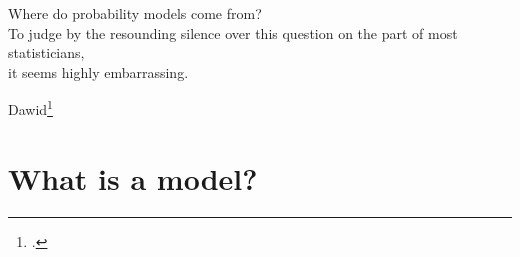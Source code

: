 \documentclass[\ifafour a4paper,12pt,\else a5paper,10pt,\fi%
onecolumn,oneside,article,%
british%
]{memoir}
\title{\propertitle}
\author{%
\hspace*{\stretch{1}}%
\parbox{0.5\linewidth}%
{\protect\centering P.G.L.  Porta Mana\\%
\footnotesize\epost{\email{piero.mana}{ntnu.no}}}%
\hspace*{\stretch{1}}%
}
\date{Draft of \today\ (first drafted \firstdraft)}
\theoremstyle{remark}
\theoremstyle{innote}
\newcommand*{\citep}{\footcites}
\newcommand*{\amp}{\&}
\newcommand*{\asudedication}[1]{%
{\par\centering\textit{#1}\par}}
\renewcommand*{\|}[1][]{\nonscript\,#1\vert\nonscript\;\mathopen{}}
\begin{document}
\captiondelim{\quad}\captionnamefont{\footnotesize}\captiontitlefont{\footnotesize}
\frenchspacing
\maketitle

\abstractrunin
\abslabeldelim{}
\renewcommand*{\abstractname}{}
\setlength{\absleftindent}{0pt}
\setlength{\absrightindent}{0pt}
\setlength{\abstitleskip}{-\absparindent}
\begin{abstract}%
  \noindent ***
\\\noindent\emph{\footnotesize Note: Dear Reader
    \amp\ Peer, this manuscript is being peer-reviewed by you. Thank you.}
\end{abstract}
\frenchspacing

 \setlength{\epigraphwidth}{.5\columnwidth}
 \epigraphfontsize{\footnotesize}
 \setlength{\epigraphrule}{0pt}
 \epigraph{Where do probability models come from?\\ To judge by the resounding
  silence over this question on the part of most statisticians,\\ it seems
  highly embarrassing.}{Dawid\citep[p.~220]{dawid1982}}




\section{What is a model?}
\label{sec:what_model}
\end{document}
